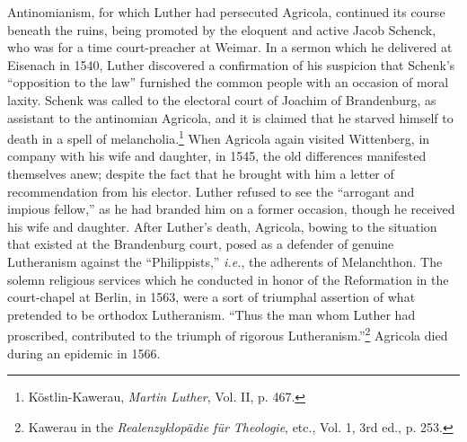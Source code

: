 Antinomianism, for which Luther had persecuted Agricola, continued its
course beneath the ruins, being promoted by the eloquent
and active Jacob Schenck, who was for a time court-preacher at Weimar.
In a sermon which he delivered at Eisenach in 1540, Luther discovered
a confirmation of his suspicion that Schenk’s “opposition to
the law” furnished the common people with an occasion of moral
laxity. Schenk was called to the electoral court of Joachim of Brandenburg,
as assistant to the antinomian Agricola, and it is claimed
that he starved himself to death in a spell of melancholia.\footnote{Köstlin-Kawerau, \textit{Martin Luther}, Vol. II, p. 467.}
 When
Agricola again visited Wittenberg, in company with his wife and
daughter, in 1545, the old differences manifested themselves anew;
despite the fact that he brought with him a letter of recommendation from
his elector. Luther refused to see the “arrogant and impious fellow,”
as he had branded him on a former occasion, though he
received his wife and daughter. After Luther’s death, Agricola, bowing
to the situation that existed at the Brandenburg court, posed as a
defender of genuine Lutheranism against the “Philippists,” \textit{i.e.}, the
adherents of Melanchthon. The solemn religious services which he
conducted in honor of the Reformation in the court-chapel at Berlin,
in 1563, were a sort of triumphal assertion of what pretended to be
orthodox Lutheranism. “Thus the man whom Luther had proscribed,
contributed to the triumph of rigorous Lutheranism.”\footnote
{Kawerau in the \textit{Realenzyklopädie für Theologie}, etc., Vol. 1, 3rd ed., p. 253.}
Agricola died during an epidemic in 1566.

